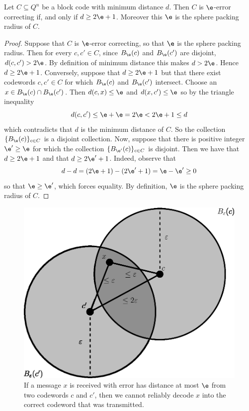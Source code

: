 \begin{lemma}\label{lemma_1.1.2}
  Let $C \subseteq Q^n$ be a block code with minimum distance $d$. Then $C$ is
  $\e$-error correcting if, and only if $d \geq 2\e+1$. Moreover this $\e$ is
  the sphere packing radius of $C$.
\end{lemma}
\begin{proof}
  Suppose that $C$ is $\e$-error correcting, so that $\e$ is the sphere packing
  radius. Then for every $c,c' \in C$, since $B_\e(c)$ and $B_\e(c')$ are
  disjoint, $d(c,c') > 2\e$. By definition of minimum distance this makes
  $d>2\e$. Hence $d \geq 2\e+1$. Conversely, suppose that $d \geq 2\e+1$ but
  that there exist codewords $c,c' \in C$ for which $B_\e(c)$ and $B_\e(c')$
  intersect. Choose an $x \in B_\e(c) \cap B_\e(c')$. Then $d(c,x) \leq \e$ and
  $d(x,c') \leq \e$ so by the triangle inequality
  \begin{equation*}
    d(c,c') \leq \e+\e=2\e<2\e+1 \leq d
  \end{equation*}
  which contradicts that $d$ is the minimum distance of $C$. So the collection
  $\{B_\e(c)\}_{c \in C}$ is a disjoint collection. Now, suppose that there is
  positive integer $\e' \geq \e$ for which the collection $\{B_{\e'}(c)\}_{c \in
  C}$ is disjoint. Then we have that $d \geq 2\e+1$ and that $d \geq 2\e'+1$.
  Indeed, observe that
  \begin{equation*}
    d-d=(2\e+1)-(2\e'+1)=\e-\e' \geq 0
  \end{equation*}
  so that $\e \geq \e'$, which forces equality. By definition, $\e$ is the
  sphere packing radius of $C$.
\end{proof}

\begin{figure}[h]
  \centering
  \includegraphics[scale = 0.5]{Figures/Chapter1/sphere_packing.eps}
  \caption{If a message $x$ is received with error has distance at most $\e$
  from two codewords $c$ and $c'$, then we cannot reliably decode $x$ into the
  correct codeword that was transmitted.}
  \label{figure_1.1}
\end{figure}


